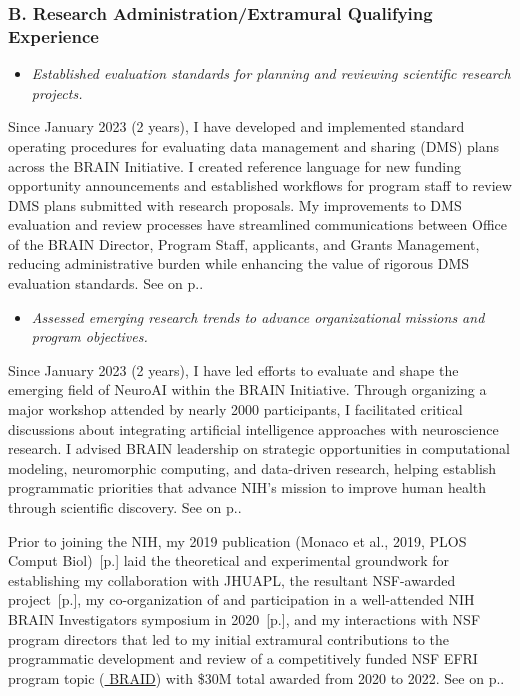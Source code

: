 \documentclass[10pt]{article}
\newcommand{\unpubtitle}[1]{{\color{hopkinsblue} #1}}
\newcommand{\see}[1]{[\textcolor{hopkinsblue}{p.\pageref{sec:#1}}]}
\newcommand{\cf}[1]{\textcolor{hopkinsblue}{See \emph{\nameref{sec:#1}} on p.\pageref{sec:#1}}}
\begin{document}
\subsubsection*{B. Research Administration/Extramural Qualifying Experience}

\begin{itemize}
  \color{hopkinsblue}
  \item \emph{Established evaluation standards for planning and reviewing
scientific research projects.}
\end{itemize}

Since January 2023 (2 years), I have developed and implemented standard
operating procedures for evaluating data management and sharing (DMS) plans
across the BRAIN Initiative. I created reference language for new funding
opportunity announcements and established workflows for program staff to review
DMS plans submitted with research proposals. My improvements to DMS evaluation
and review processes have streamlined communications between Office of the
BRAIN Director, Program Staff, applicants, and Grants Management, reducing
administrative burden while enhancing the value of rigorous DMS evaluation
standards. \cf{jobobd}.

\begin{itemize}
  \color{hopkinsblue}
  \item \emph{Assessed emerging research trends to advance organizational
missions and program objectives.}
\end{itemize}

Since January 2023 (2 years), I have led efforts to evaluate and shape the
emerging field of NeuroAI within the BRAIN Initiative. Through organizing a
major workshop attended by nearly 2000 participants, I facilitated critical
discussions about integrating artificial intelligence approaches with
neuroscience research. I advised BRAIN leadership on strategic opportunities
in computational modeling, neuromorphic computing, and data-driven research,
helping establish programmatic priorities that advance NIH's mission to improve
human health through scientific discovery. \cf{jobobd}.

Prior to joining the NIH, my 2019 publication (Monaco et al., 2019, PLOS
Comput Biol)~\see{pubs} laid the theoretical and experimental groundwork
for establishing my collaboration with JHUAPL, the resultant NSF-awarded
project~\see{funding}, my co-organization of and participation in a
well-attended NIH BRAIN Investigators symposium in 2020~\see{symposium}, and
my interactions with NSF program directors that led to my initial extramural
contributions to the programmatic development and review of a competitively
funded NSF EFRI program topic (\href{https://www.nsf.gov/awardsearch/advancedSearchResult?PIId=&PIFirstName=&PILastName=&PIOrganization=&PIState=&PIZip=&PICountry=&ProgOrganization=07040000&ProgEleCode=7633&BooleanElement=All&ProgRefCode=&BooleanRef=All&Program=&ProgOfficer=&Keyword=BRAID&AwardNumberOperator=&AwardAmount=&AwardInstrument=&ActiveAwards=true&OriginalAwardDateOperator=&StartDateOperator=&ExpDateOperator=}{\unpubtitle{BRAID}}) 
with \$30M total awarded from 2020 to 2022. \cf{programsvc}.
\end{document}
